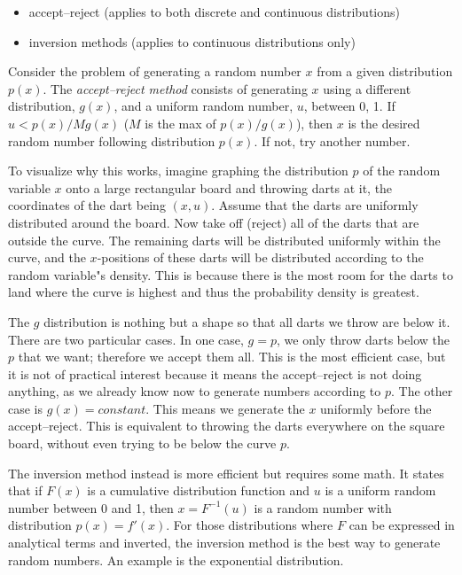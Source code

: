 \documentclass[justified, sixbynine]{tufte-book}
\theoremstyle{plain}%
\newtheorem * {corollary}{Corollary}
\theoremstyle{definition}
\theoremstyle{remark}
\newtheorem * {remark}{Remark}
\newtheorem * {note}{Note}
\begin{document}
\begin{fullwidth}
\begin{itemize}
\item accept--reject (applies to both discrete and continuous distributions)
\item inversion methods (applies to continuous distributions only)
\end{itemize}

Consider the problem of generating a random number $x$ from a given distribution $p(x)$. The {\it accept--reject method} consists of generating $x$ using a different distribution, $g(x)$, and a uniform random number, $u$, between 0, 1. If $u<p(x)/Mg(x)$ ($M$ is the max of $p(x)/g(x)$), then $x$ is the desired random number following distribution $p(x)$. If not, try another number.

To visualize why this works, imagine graphing the distribution $p$ of the random variable $x$ onto a large rectangular board and throwing darts at it, the coordinates of the dart being $(x, u)$. Assume that the darts are uniformly distributed around the board. Now take off (reject) all of the darts that are outside the curve. The remaining darts will be distributed uniformly within the curve, and the $x$-positions of these darts will be distributed according to the random variable"s density. This is because there is the most room for the darts to land where the curve is highest and thus the probability density is greatest.

The $g$ distribution is nothing but a shape so that all darts we throw are below it. There are two particular cases. In one case, $g=p$, we only throw darts below the $p$ that we want; therefore we accept them all. This is the most efficient case, but it is not of practical interest because it means the accept--reject is not doing anything, as we already know now to generate numbers according to $p$. The other case is $g(x) = constant$. This means we generate the $x$ uniformly before the accept--reject. This is equivalent to throwing the darts everywhere on the square board, without even trying to be below the curve $p$.

The inversion method instead is more efficient but requires some math. It states that if $F(x)$ is a cumulative distribution function and $u$ is a uniform random number between 0 and 1, then $x = F^{-1}(u)$ is a random number with distribution $p(x)=f'(x)$. For those distributions where $F$ can be expressed in analytical terms and inverted, the inversion method is the best way to generate random numbers. An example is the exponential distribution.


\end{fullwidth}
\end{document}
